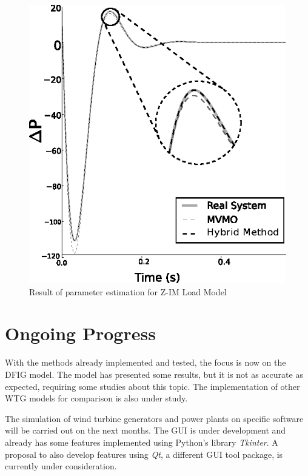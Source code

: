 \begin{figure}[h]
	\caption{Result of parameter estimation for Z-IM Load Model}
	\begin{center}
		\includegraphics[scale=1]{Images/ZIM.eps}
	\end{center}
	\label{fig: ZIM}
\end{figure}

\section{Ongoing Progress}

With the methods already implemented and tested, the focus is now on the DFIG model. The model has presented some results, but it is not as accurate as expected, requiring some studies about this topic. The implementation of other WTG models for comparison is also under study.

The simulation of wind turbine generators and power plants on specific software will be carried out on the next months. The GUI is under development and already has some features implemented using Python's library \textit{Tkinter}. A proposal to also develop features using \textit{Qt}, a different GUI tool package, is currently under consideration.